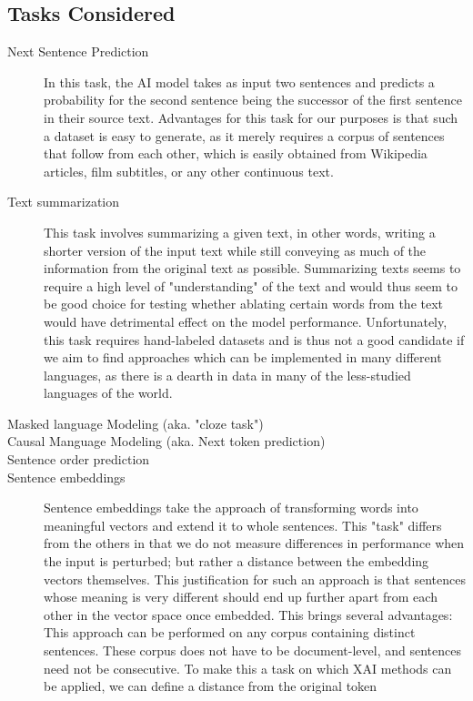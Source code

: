 \subsection{Tasks Considered}
\begin{description}
	\item[Next Sentence Prediction]
	      In this task, the AI model takes as input two sentences and predicts a probability for the second sentence being the successor of the first sentence in their source text.
	      Advantages for this task for our purposes is that such a dataset is easy to generate, as it merely requires a corpus of sentences that follow from each other, which is easily obtained from Wikipedia articles, film subtitles, or any other continuous text.

	\item[Text summarization]
	      This task involves summarizing a given text, in other words, writing a shorter version of the input text while still conveying as much of the information from the original text as possible.
	      Summarizing texts seems to require a high level of "understanding" of the text and would thus seem to be good choice for testing whether ablating certain words from the text would have detrimental effect on the model performance.
	      Unfortunately, this task requires hand-labeled datasets and is thus not a good candidate if we aim to find approaches which can be implemented in many different languages, as there is a dearth in data in many of the less-studied languages of the world.

	\item[Masked language Modeling (aka. "cloze task")]
	\item[Causal Manguage Modeling (aka. Next token prediction)]
	\item[Sentence order prediction]
	\item[Sentence embeddings]
	      Sentence embeddings take the approach of transforming words into meaningful vectors and extend it to whole sentences.
	      This "task" differs from the others in that we do not measure differences in performance when the input is perturbed; but rather a distance between the embedding vectors themselves.
	      This justification for such an approach is that sentences whose meaning is very different should end up further apart from each other in the vector space once embedded.
	      This brings several advantages:
	      This approach can be performed on any corpus containing distinct sentences.
	      These corpus does not have to be document-level, and sentences need not be consecutive.
	      To make this a task on which XAI methods can be applied, we can define a distance from the original token
\end{description}

